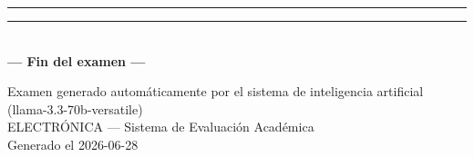 \documentclass[11pt,a4paper]{article}
\begin{document}
\vspace{2mm}
\rule{\linewidth}{0.2pt}
\vspace{3cm}  %



\vspace{12pt}
\begin{center}
  \rule{0.6\linewidth}{0.4pt} \\[6pt]
  \textbf{--- Fin del examen ---}
\end{center}

\vfill
\begin{center}
  \footnotesize\color{gray}
  Examen generado automáticamente por el sistema de inteligencia artificial (llama-3.3-70b-versatile) \\
  ELECTRÓNICA --- Sistema de Evaluación Académica \\
  Generado el 2026-06-28
\end{center}
\end{document}
